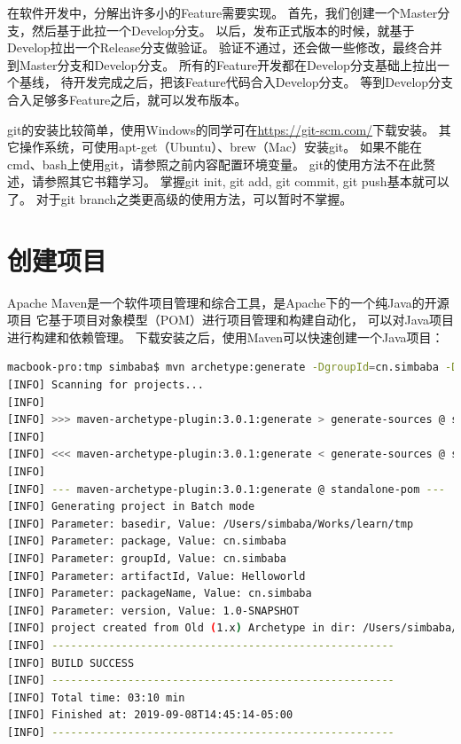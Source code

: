在软件开发中，分解出许多小的Feature需要实现。
首先，我们创建一个Master分支，然后基于此拉一个Develop分支。
以后，发布正式版本的时候，就基于Develop拉出一个Release分支做验证。
验证不通过，还会做一些修改，最终合并到Master分支和Develop分支。
所有的Feature开发都在Develop分支基础上拉出一个基线，
待开发完成之后，把该Feature代码合入Develop分支。
等到Develop分支合入足够多Feature之后，就可以发布版本。

git的安装比较简单，使用Windows的同学可在\url{https://git-scm.com/}下载安装。
其它操作系统，可使用apt-get（Ubuntu）、brew（Mac）安装git。
如果不能在cmd、bash上使用git，请参照之前内容配置环境变量。
git的使用方法不在此赘述，请参照其它书籍学习。
掌握git init, git add, git commit, git push基本就可以了。
对于git branch之类更高级的使用方法，可以暂时不掌握。

\section{创建项目}
Apache Maven是一个软件项目管理和综合工具，是Apache下的一个纯Java的开源项目
它基于项目对象模型（POM）进行项目管理和构建自动化，
可以对Java项目进行构建和依赖管理。
下载安装之后，使用Maven可以快速创建一个Java项目：

\begin{lstlisting}[language=bash, backgroundcolor=\color{lightgray!10}]
macbook-pro:tmp simbaba$ mvn archetype:generate -DgroupId=cn.simbaba -DartifactId=Helloworld -DarchetypeArtifactId=maven-archetype-quickstart -DinteractiveMode=false
[INFO] Scanning for projects...
[INFO] 
[INFO] >>> maven-archetype-plugin:3.0.1:generate > generate-sources @ standalone-pom >>>
[INFO] 
[INFO] <<< maven-archetype-plugin:3.0.1:generate < generate-sources @ standalone-pom <<<
[INFO] 
[INFO] --- maven-archetype-plugin:3.0.1:generate @ standalone-pom ---
[INFO] Generating project in Batch mode
[INFO] Parameter: basedir, Value: /Users/simbaba/Works/learn/tmp
[INFO] Parameter: package, Value: cn.simbaba
[INFO] Parameter: groupId, Value: cn.simbaba
[INFO] Parameter: artifactId, Value: Helloworld
[INFO] Parameter: packageName, Value: cn.simbaba
[INFO] Parameter: version, Value: 1.0-SNAPSHOT
[INFO] project created from Old (1.x) Archetype in dir: /Users/simbaba/Works/learn/tmp/Helloworld
[INFO] ------------------------------------------------------
[INFO] BUILD SUCCESS
[INFO] ------------------------------------------------------
[INFO] Total time: 03:10 min
[INFO] Finished at: 2019-09-08T14:45:14-05:00
[INFO] ------------------------------------------------------
\end{lstlisting}

